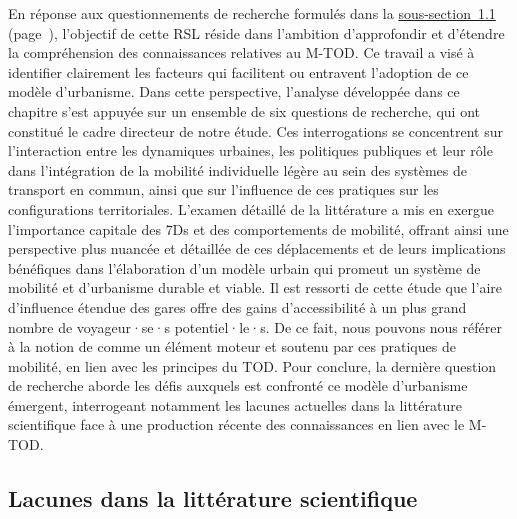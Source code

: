 \begin{refsegment}
En réponse aux questionnements de recherche formulés dans la \hyperref[chap2:formulation-questions-recherche]{sous-section~1.1} (page~\pageref{chap2:formulation-questions-recherche}), l'objectif de cette \acrshort{RSL} réside dans l'ambition d'approfondir et d'étendre la compréhension des connaissances relatives au \acrshort{M-TOD}. Ce travail a visé à identifier clairement les facteurs qui facilitent ou entravent l'adoption de ce modèle d'urbanisme. Dans cette perspective, l'analyse développée dans ce chapitre s'est appuyée sur un ensemble de six questions de recherche, qui ont constitué le cadre directeur de notre étude. Ces interrogations se concentrent sur l'interaction entre les dynamiques urbaines, les politiques publiques et leur rôle dans l'intégration de la mobilité individuelle légère au sein des systèmes de transport en commun, ainsi que sur l'influence de ces pratiques sur les configurations territoriales. L'examen détaillé de la littérature a mis en exergue l'importance capitale des \acrshort{7Ds} et des comportements de mobilité, offrant ainsi une perspective plus nuancée et détaillée de ces déplacements et de leurs implications bénéfiques dans l'élaboration d'un modèle urbain qui promeut un système de mobilité et d'urbanisme \gls{durable} et viable. Il est ressorti de cette étude que l'aire d'influence étendue des gares offre des gains d'accessibilité à un plus grand nombre de voyageur·se·s potentiel·le·s. De ce fait, nous pouvons nous référer à la notion de  \textcolor{blue}{\autocite[86]{kaufmann_retour_2014}} comme un élément moteur et soutenu par ces pratiques de mobilité, en lien avec les principes du \acrshort{TOD}. Pour conclure, la dernière question de recherche aborde les défis auxquels est confronté ce modèle d'urbanisme émergent, interrogeant notamment les lacunes actuelles dans la littérature scientifique face à une production récente des connaissances en lien avec le \acrshort{M-TOD}.%

\subsection*{Lacunes dans la littérature scientifique
    \label{chap2:literature-gap}
    }


\end{refsegment}
